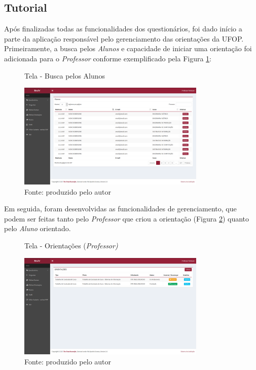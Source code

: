 \documentclass[
  12pt,       %
  openright,      %
  oneside,      %
  a4paper,      %
  english,      %
  french,        %
  spanish,     %
  brazil        %
  ]{abntex2-decsi}
\begin{document}
        \subsection{Tutorial }
       
		Após finalizadas todas as funcionalidades dos questionários, foi dado início a parte da aplicação responsável pelo gerenciamento das orientações da UFOP. Primeiramente, a busca pelos \textit{Alunos} e capacidade de iniciar uma orientação foi adicionada para o \textit{Professor} conforme exemplificado pela Figura \ref{fig:alunos_home}: 
        
        \begin{figure}[h]
        \centering
        \caption{Tela - Busca pelos Alunos}
        \includegraphics[width=0.8\textwidth]{img/alunos_home}
        \caption*{Fonte: produzido pelo autor}
        \label{fig:alunos_home}
        \end{figure}
		
        Em seguida, foram desenvolvidas as funcionalidades de gerenciamento, que podem ser feitas tanto pelo \textit{Professor} que criou a orientação (Figura \ref{fig:orientacoes_home}) quanto pelo \textit{Aluno} orientado.
        
        \begin{figure}[h]
        \centering
        \caption{Tela - Orientações (\textit{Professor)}}
        \includegraphics[width=0.8\textwidth]{img/orientacoes_home1}
        \caption*{Fonte: produzido pelo autor}
        \label{fig:orientacoes_home}
        \end{figure}
        
\end{document}
